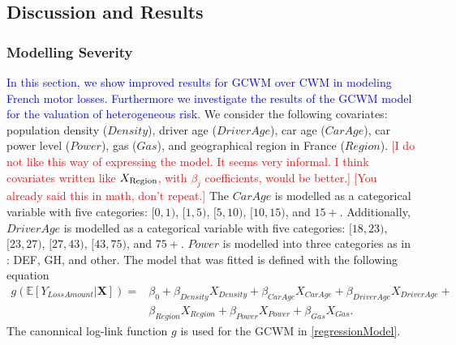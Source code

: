 \documentclass[11pt,letterpaper]{article}
\numberwithin{equation}{section}
\numberwithin{equation}{section}
\numberwithin{equation}{section}
\begin{document}
\subsection{Discussion and Results}
\subsubsection{Modelling Severity}
\textcolor{blue}{In this section, we show improved results for GCWM  over CWM in modeling French motor losses. Furthermore we investigate the results of the GCWM model for the valuation of heterogeneous risk.} We consider the following covariates: population density ($Density$), driver age ($DriverAge$), car age ($CarAge$), car power level ($Power$), gas ($Gas$),  and geographical region in France ($Region$). %
\textcolor{red}{[I do not like this way of expressing the model. It seems very informal. I think covariates written like $X_{\tiny \text{Region}}$, with $\beta_j$ coefficients, would be better.]}
 \textcolor{red}{[You already said this in math, don't repeat.]} 
The
$CarAge$ is modelled as a categorical variable with five categories: $[0,1)$, $[1,5)$, $[5,10)$, $[10,15)$, and $15+$. Additionally, $DriverAge$ is modelled as a categorical variable with five categories: $[18,23)$, $[23,27)$, $[27,43)$, $[43,75)$, and $75+$. $Power$ is modelled into three categories as in \cite{Charpentier:2014}:
DEF, GH, and other. The model that was fitted is defined with the following equation
\begin{align}
g(\mathbb{E}\left[Y_{LossAmount}|\bm{X}\right]) = 
 & \beta_{0} +  \beta_{Density} X_{Density}+ \beta_{Car Age} X_{Car Age}+ \beta_{Driver Age} X_{Driver Age} + \nonumber \\ &  \beta_{Region}X_{Region} + \beta_{Power}X_{Power} + \beta_{Gas} X_{Gas}. \label{regressionModel}
\end{align}
The canonnical log-link function $g$ is used for the GCWM in \eqref{regressionModel}. 
\end{document}
